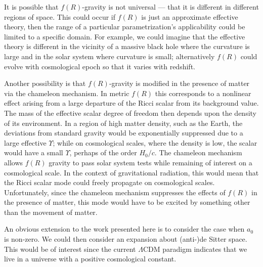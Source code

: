 It is possible that $f(R)$-gravity is not universal --- that it is different in different regions of space. This could occur if $f(R)$ is just an approximate effective theory, then the range of a particular parametrization's applicability could be limited to a specific domain. For example, we could imagine that the effective theory is different in the vicinity of a massive black hole where the curvature is large and in the solar system where curvature is small; alternatively $f(R)$ could evolve with cosmological epoch so that it varies with redshift.

Another possibility is that $f(R)$-gravity is modified in the presence of matter via the chameleon mechanism\cite{Khoury2004, Khoury2004a}. In metric $f(R)$ this corresponds to a nonlinear effect arising from a large departure of the Ricci scalar from its background value\cite{DeFelice2010}. The mass of the effective scalar degree of freedom then depends upon the density of its environment. In a region of high matter density, such as the Earth, the deviations from standard gravity would be exponentially suppressed due to a large effective $\Upsilon$; while on cosmological scales, where the density is low, the scalar would have a small $\Upsilon$, perhaps of the order $H_0/c$\cite{Khoury2004, Khoury2004a}. The chameleon mechanism allows $f(R)$ gravity to pass solar system tests while remaining of interest on a cosmological scale. In the context of gravitational radiation, this would mean that the Ricci scalar mode could freely propagate on cosmological scales. Unfortunately, since the chameleon mechanism suppresses the effects of $f(R)$ in the presence of matter, this mode would have to be excited by something other than the movement of matter.

An obvious extension to the work presented here is to consider the case when $a_0$ is non-zero. We could then consider an expansion about (anti-)de Sitter space. This would be of interest since the current $\Lambda$CDM paradigm indicates that we live in a universe with a positive cosmological constant. 
